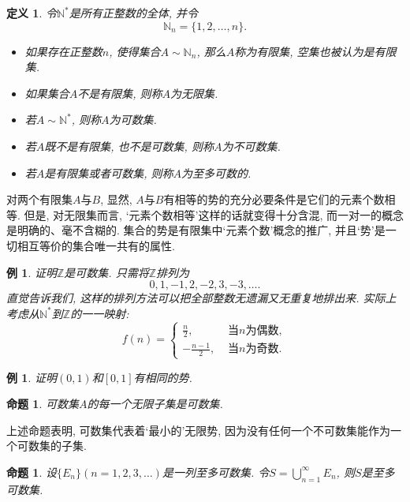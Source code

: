 \documentclass[UTF8,11pt, a4paper, oneside, fontset=none]{ctexbook}
\newtheorem{definition}[theorem]{定义}
\newtheorem{example}[theorem]{例}
\newtheorem{proposition}[theorem]{命题}
\begin{document}
\begin{definition}
令$\mathbb N^*$是所有正整数的全体, 并令
\[
\mathbb N_n = \{ 1, 2, \ldots, n\}.
\]
\begin{itemize}
\item[(1)] 如果存在正整数$n$, 使得集合$A \sim \mathbb N_n$, 那么$A$称为有限集, 空集也被认为是有限集.
\item[(2)] 如果集合$A$不是有限集, 则称$A$为无限集.
\item[(3)] 若$A \sim \mathbb N^*$, 则称$A$为可数集.
\item[(4)] 若$A$既不是有限集, 也不是可数集, 则称$A$为不可数集.
\item[(5)] 若$A$是有限集或者可数集, 则称$A$为至多可数的.
\end{itemize}
\end{definition}


对两个有限集$A$与$B$, 显然, $A$与$B$有相等的势的充分必要条件是它们的元素个数相等. 但是, 对无限集而言, `元素个数相等'这样的话就变得十分含混, 而一对一的概念是明确的、毫不含糊的. 集合的势是有限集中`元素个数'概念的推广, 并且`势'是一切相互等价的集合唯一共有的属性.


\begin{example}
证明$\mathbb Z$是可数集. 只需将$\mathbb Z$排列为
\[
0, 1, -1, 2, -2, 3, -3, \ldots.
\]
直觉告诉我们, 这样的排列方法可以把全部整数无遗漏又无重复地排出来. 实际上考虑从$\mathbb N^*$到$\mathbb Z$的一一映射:
\[
f(n) = \begin{cases}
\frac{n}{2}, &\mbox{ 当$n$为偶数},\\
-\frac{n-1}{2}, &\mbox{ 当$n$为奇数}.
\end{cases}
\]
\end{example}


\begin{example}
证明$(0, 1)$和$[0, 1]$有相同的势.
\end{example}





\begin{proposition}
可数集$A$的每一个无限子集是可数集.
\end{proposition} 





上述命题表明, 可数集代表着`最小的'无限势, 因为没有任何一个不可数集能作为一个可数集的子集.


\begin{proposition}
设$\{ E_n \} (n =1, 2, 3, \ldots)$是一列至多可数集. 令$S = \bigcup_{n=1}^{\infty} E_n$, 则$S$是至多可数集.
\end{proposition}
\end{document}

